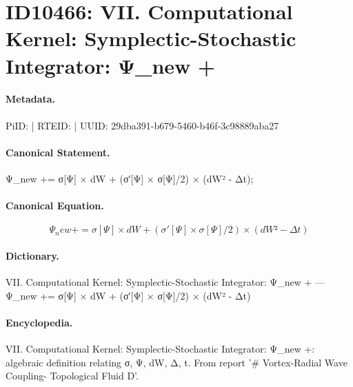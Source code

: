 \section*{ID10466: VII. Computational Kernel: Symplectic-Stochastic Integrator: Ψ\_new +}
\paragraph{Metadata.}
PiID:  | RTEID:  | UUID: 29dba391-b679-5460-b46f-3c98889aba27

\paragraph{Canonical Statement.}
Ψ\_new += σ[Ψ] × dW + (σ′[Ψ] × σ[Ψ]/2) × (dW² - Δt);

\paragraph{Canonical Equation.}
\[
Ψ_new += σ[Ψ] × dW + (σ′[Ψ] × σ[Ψ]/2) × (dW² - Δt)
\]

\paragraph{Dictionary.}
VII. Computational Kernel: Symplectic-Stochastic Integrator: Ψ\_new + — Ψ\_new += σ[Ψ] × dW + (σ′[Ψ] × σ[Ψ]/2) × (dW² - Δt)

\paragraph{Encyclopedia.}
VII. Computational Kernel: Symplectic-Stochastic Integrator: Ψ\_new +: algebraic definition relating σ, Ψ, dW, Δ, t. From report '\# Vortex-Radial Wave Coupling- Topological Fluid D'.
